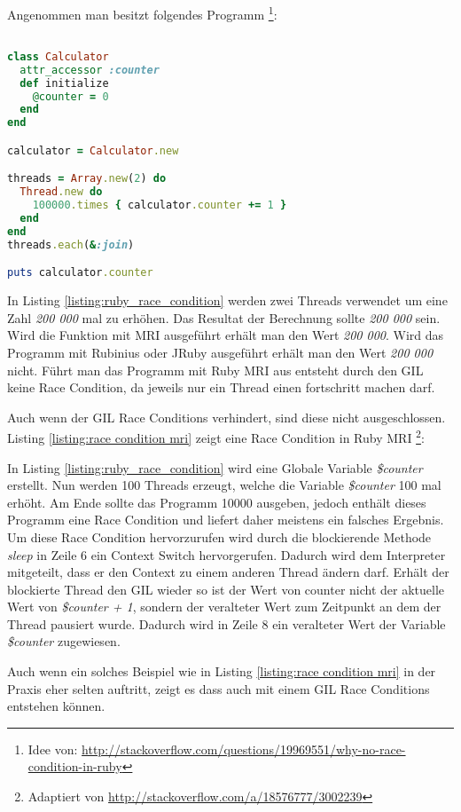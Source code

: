 Angenommen man besitzt folgendes Programm \footnote{Idee von: \url{http://stackoverflow.com/questions/19969551/why-no-race-condition-in-ruby}}: 

\begin{lstlisting}[language=Ruby,label={listing:race condition}]

class Calculator
  attr_accessor :counter
  def initialize
    @counter = 0
  end
end

calculator = Calculator.new

threads = Array.new(2) do
  Thread.new do
    100000.times { calculator.counter += 1 }
  end
end
threads.each(&:join)

puts calculator.counter

\end{lstlisting}

In Listing \ref{listing:ruby_race_condition} werden zwei Threads verwendet um eine Zahl \emph{200 000} mal zu erhöhen. Das Resultat der Berechnung sollte \emph{200 000} sein. Wird die Funktion mit MRI ausgeführt erhält man den Wert \emph{200 000}. Wird das Programm mit Rubinius oder JRuby ausgeführt erhält man den Wert \emph{200 000} nicht. Führt man das Programm mit Ruby MRI aus entsteht durch den GIL keine Race Condition, da jeweils nur ein Thread einen fortschritt machen darf.

Auch wenn der GIL Race Conditions verhindert, sind diese nicht ausgeschlossen. Listing \ref{listing:race condition mri} zeigt eine Race Condition in Ruby MRI \footnote{Adaptiert von \url{http://stackoverflow.com/a/18576777/3002239}}:

In Listing \ref{listing:ruby_race_condition} wird eine Globale Variable \emph{\$counter} erstellt. Nun werden 100 Threads erzeugt, welche die Variable \emph{\$counter} 100 mal erhöht. Am Ende sollte das Programm 10000 ausgeben, jedoch enthält dieses Programm eine Race Condition und liefert daher meistens ein falsches Ergebnis. Um diese Race Condition hervorzurufen wird durch die blockierende Methode \emph{sleep} in Zeile 6 ein Context Switch hervorgerufen. Dadurch wird dem Interpreter mitgeteilt, dass er den Context zu einem anderen Thread ändern darf. Erhält der blockierte Thread den GIL wieder so ist der Wert von counter nicht der aktuelle Wert von  \emph{\$counter + 1}, sondern der veralteter Wert zum Zeitpunkt an dem der Thread pausiert wurde. Dadurch wird in Zeile 8 ein veralteter Wert der Variable \emph{\$counter} zugewiesen. 

Auch wenn ein solches Beispiel wie in Listing \ref{listing:race condition mri} in der Praxis eher selten auftritt, zeigt es dass auch mit einem GIL Race Conditions entstehen können.

